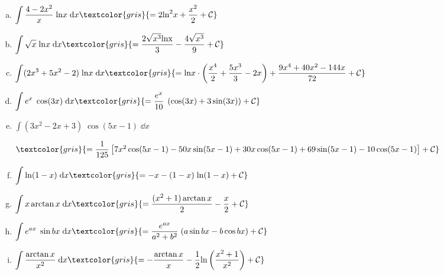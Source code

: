 	\begin{enumerate}[a) ]
	
	
	\item $\displaystyle \int \dfrac {4-2x^2}{x}\; \mathrm{ln} x \; \dd x \textcolor{gris}{=2 \mathrm{ln}^2 x+ \dfrac{x^2}{2}+\mathcal C}$
	
	\item $\displaystyle \int \sqrt{x}\; \mathrm{ln}x \; \dd x \textcolor{gris}{=\dfrac {2 \sqrt{x^3} \mathrm{ln x}}{3}  - \dfrac {4 \sqrt{x^3}}{9}+\mathcal C}$
	
	\item $\displaystyle \int (2x^3+5x^2-2)\; \mathrm{ln} x \; \dd x \textcolor{gris}{= \mathrm{ln} x \cdot \left(  \dfrac{x^4}{2} + \dfrac {5x^3}{3} -2x \right)+ \dfrac {9x^4+40x^2-144x}{72}+\mathcal C}$
	
	\item $\displaystyle \int e^x\; \cos (3x) \; \dd x \textcolor{gris}{=\dfrac {e^x}{10}\; \left( \cos (3x) +3 \sin (3x)  \right)+\mathcal C}$
	
	\item $\displaystyle \int (3x^2-2x+3)\; \cos(5x-1) \; \dd x $
	
	\footnotesize {$\textcolor{gris}{= \dfrac {1}{125} \left[ 7x^2 \cos(5x-1) -50x\sin(5x-1)+30x\cos(5x-1)+69\sin(5x-1)-10\cos(5x-1) \right]+\mathcal C}$}
	
	\item $\displaystyle \int \mathrm{ln} (1-x) \; \dd x \textcolor{gris}{=-x-(1-x)\; \mathrm{ln}(1-x)+\mathcal C}$
	
	\item $\displaystyle \int x \arctan x \; \dd x \textcolor{gris}{=\dfrac  {(x^2+1)\arctan x}{2} -\dfrac x 2 +\mathcal C}$
	
	\item $\displaystyle \int e^{ax}\; \sin bx \; \dd x \textcolor{gris}{= \dfrac{e^{ax}}{a^2+b^2}\; (a \sin bx - b \cos bx) +\mathcal C}$
	
	\item $\displaystyle \int \dfrac {\arctan x}{x^2} \; \dd x \textcolor{gris}{=- \dfrac {\arctan x}{x}- \dfrac 1 2 \mathrm{ln}\left(\dfrac {x^2+1}{x^2}\right)+\mathcal C}$
	
	\end{enumerate}



